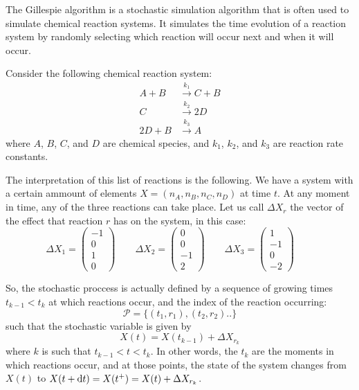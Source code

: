 The Gillespie algorithm is a stochastic simulation algorithm that is often used to simulate chemical reaction systems. It simulates the time evolution of a reaction system by randomly selecting which reaction will occur next and when it will occur.

Consider the following chemical reaction system:
\begin{align}
A + B &\xrightarrow{k_1} C + B\\
C &\xrightarrow{k_2} 2 D  \\
2 D + B&\xrightarrow{k_3} A 
\end{align}
where $A$, $B$, $C$, and $D$ are chemical species, and $k_1$, $k_2$, and $k_3$ are reaction rate constants.

The interpretation of this list of reactions is the following. We have a system with a certain ammount of elements $X=(n_A,n_B,n_C,n_D)$ at time $t$. At any moment in time, any of the three reactions can take place. Let us call $\Delta X_r$ the vector of the effect that reaction $r$ has on the system, in this case:
\[  \Delta X_1= \begin{pmatrix} 
              -1\\
              0 \\
              1\\
              0
             \end{pmatrix}
\qquad  \Delta X_2= \begin{pmatrix} 
              0\\
              0 \\
              -1\\
              2
             \end{pmatrix}
\qquad \Delta X_3= \begin{pmatrix} 
              1\\
              -1 \\
              0\\
              -2
             \end{pmatrix}
\qquad \]

So, the stochastic proccess is actually defined by a sequence of growing times $t_{k-1}< t_{k}$ at which reactions occur, and the index of the reaction occurring:
\[ \mathcal P = \{ (t_1, r_1), (t_2, r_2).. \}\]
such that the stochastic variable is given by 
\[ X(t) = X(t_{k-1}) + \Delta X_{r_k} \]
where $k$ is such that $t_{k-1} <t < t_{k}$. In other words, the $t_k$ are the moments in which reactions occur, and at those points, the state of the system changes from $X(t)$ to $X(t+\mathrm{d} t) = X(t^+) = X(t) + \Delta X_{r_k}$.

